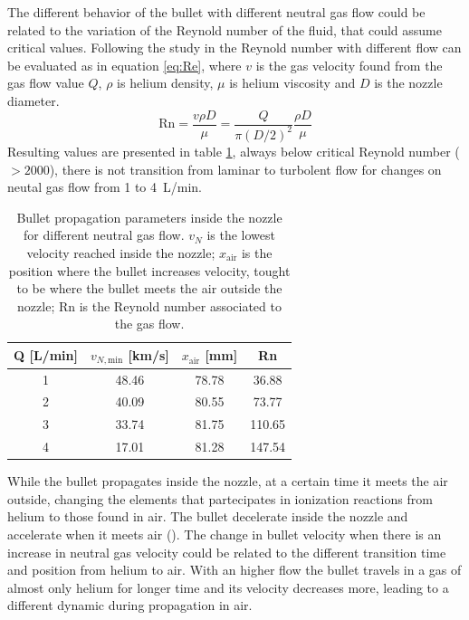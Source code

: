 The different behavior of the bullet with different neutral gas flow could be related to the variation of the Reynold number of the fluid, that could assume critical values. Following the study in \cite{doi:10.1063/1.4819246} the Reynold number with different flow can be evaluated as in equation \ref{eq:Re}, where $v$ is the gas velocity found from the gas flow value $Q$, $\rho$ is helium density, $\mu$ is helium viscosity and $D$ is the nozzle diameter.
\begin{equation}
 \text{Rn} = \frac{v \rho D}{\mu} = \frac{Q}{\pi (D/2)^2} \frac{\rho D}{\mu}
 \label{eq:Re}
\end{equation}
Resulting values are presented in table \ref{tab:elio_Re}, always below critical Reynold number ($> \num{2000}$), there is not transition from laminar to turbolent flow for changes on neutal gas flow from \num{1} to \SI{4}{\liter/\minute}.
\begin{table}
  \centering
  \begin{tabular}{cccc}
  \toprule
  Q [L/min]   &$v_{N,\text{min}}$ [km/s]   &$x_{\text{air}}$ [\si{\milli\meter}]   &Rn\\
  \midrule
  1    &\num{48.46}    &\num{78.78}     &\num{36.88}\\
  2    &\num{40.09}    &\num{80.55}     &\num{73.77}\\
  3    &\num{33.74}    &\num{81.75}     &\num{110.65}\\
  4    &\num{17.01}    &\num{81.28}     &\num{147.54}\\
  \bottomrule
  \end{tabular}
  \caption{Bullet propagation parameters inside the nozzle for different neutral gas flow. $v_{N}$ is the lowest velocity reached inside the nozzle; $x_{\text{air}}$ is the position where the bullet increases velocity, tought to be where the bullet meets the air outside the nozzle; Rn is the Reynold number associated to the gas flow.}
  \label{tab:elio_Re}
\end{table}

While the bullet propagates inside the nozzle, at a certain time it meets the air outside, changing the elements that partecipates in ionization reactions from helium to those found in air. The bullet decelerate inside the nozzle and accelerate when it meets air (\cite{Jarrige_2010}).
The change in bullet velocity when there is an increase in neutral gas velocity could be related to the different transition time and position from helium to air. With an higher flow the bullet travels in a gas of almost only helium for longer time and its velocity decreases more, leading to a different dynamic during propagation in air.


